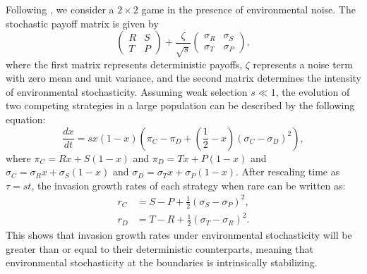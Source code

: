 \documentclass[12pt]{article}
\begin{document}
Following \cite{wang2025evolution}, we consider a $2\times 2$ game in the presence of environmental noise. 
The stochastic payoff matrix is given by
\begin{equation}
\begin{pmatrix}
R & S \\
T & P
\end{pmatrix} +
\frac{\zeta}{\sqrt{s}} \begin{pmatrix}
\sigma_R & \sigma_S \\
\sigma_T & \sigma_P
\end{pmatrix}, 
\end{equation}
where the first matrix represents deterministic payoffs,
$\zeta$ represents a noise term with zero mean and unit variance,
and the second matrix determines the intensity of environmental stochasticity.
Assuming weak selection $s\ll 1$, the evolution of two competing strategies in a large population can be described by the following equation:
\begin{equation}
\frac{dx}{dt} = s x (1-x) \left(\pi_C - \pi_D + \left(\frac{1}{2} - x \right) (\sigma_C - \sigma_D)^2 \right),
\end{equation}
where $\pi_C = Rx + S(1-x)$ and $\pi_D = T x + P(1-x)$ and $\sigma_C = \sigma_R x + \sigma_S (1-x)$ and $\sigma_D = \sigma_T x + \sigma_P (1-x)$.
After rescaling time as $\tau = st$, the invasion growth rates of each strategy when rare can be written as:
\begin{align}
r_C &= S - P + \frac{1}{2}(\sigma_S - \sigma_P)^2,\\
r_D &= T - R + \frac{1}{2}(\sigma_T - \sigma_R)^2. 
\end{align}
This shows that invasion growth rates under environmental stochasticity will be greater than or equal to their deterministic counterparts, meaning that environmental stochasticity at the boundaries is intrinsically stabilizing.
\end{document}
